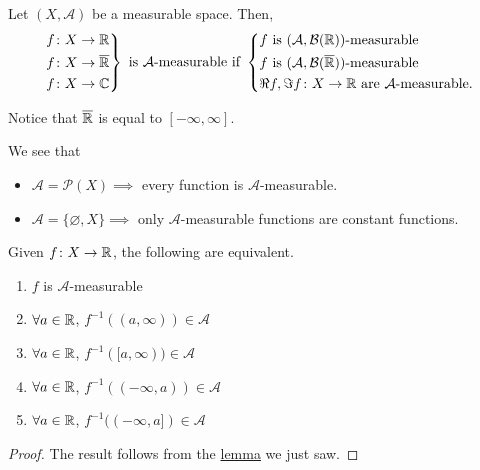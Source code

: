 \begin{definition}
	Let \((X, \mathcal{A} )\) be a measurable space. Then,
	\[
		\begin{rcases}
			f \colon X\to \mathbb{\MakeUppercase{r}}            \\
			f \colon X\to \overline{\mathbb{\MakeUppercase{r}}} \\
			f \colon X\to \mathbb{\MakeUppercase{c}}
		\end{rcases} \text{ is \(\mathcal{A}\)-measurable if } \begin{dcases}
			f             \text{ is } (\mathcal{A} , \mathcal{B} (\mathbb{\MakeUppercase{r}} ))\text{-measurable}           \\
			f             \text{ is } (\mathcal{A} , \mathcal{B} (\overline{\mathbb{\MakeUppercase{r}}}))\text{-measurable} \\
			\Re f, \Im  f  \colon X\to \mathbb{\MakeUppercase{r}} \text{ are }\mathcal{A} \text{-measurable}.
		\end{dcases}
	\]
\end{definition}
\begin{notation}
	Notice that \(\overline{\mathbb{\MakeUppercase{r}} }\) is equal to \([-\infty , \infty ]\).
\end{notation}
\begin{eg}
	We see that
	\begin{itemize}
		\item \(\mathcal{A} =\mathcal{P} (X) \implies \) every function is \(\mathcal{A}\)-measurable.
		\item \(\mathcal{A} = \{\varnothing , X\}\implies \) only \(\mathcal{A} \)-measurable functions are constant functions.
	\end{itemize}
\end{eg}

\begin{lemma}
	Given \(f\colon X\to \mathbb{\MakeUppercase{r}} \), the following are equivalent.
	\begin{enumerate}
		\item \(f\) is \(\mathcal{A}\)-measurable
		\item \(\forall a\in\mathbb{\MakeUppercase{r}} \), \(f^{-1} ((a, \infty ))\in\mathcal{A} \)
		\item \(\forall a\in\mathbb{\MakeUppercase{r}} \), \(f^{-1} ([a, \infty ))\in\mathcal{A} \)
		\item \(\forall a\in\mathbb{\MakeUppercase{r}} \), \(f^{-1} ((-\infty, a))\in\mathcal{A} \)
		\item \(\forall a\in\mathbb{\MakeUppercase{r}} \), \(f^{-1} ((-\infty, a])\in\mathcal{A} \)
	\end{enumerate}
\end{lemma}
\begin{proof}
	The result follows from the \hyperref[lma:lec10-1]{lemma} we just saw.
\end{proof}

